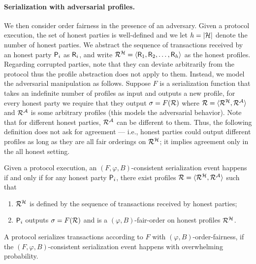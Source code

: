 \paragraph{Serialization with adversarial profiles.}
%
We then consider order fairness in the presence of an adversary.
%
Given a protocol execution, the set of honest parties \honestPartySet is well-defined and we let $h = |\mathcal{H}|$ denote the number of honest parties.
%
We abstract the sequence of transactions received by an honest party $\mathsf{P}_i$ as $\mathsf{R}_i$, and write $\mathcal{R}^\mathcal{H} = \langle \mathsf{R}_1, \mathsf{R}_2, \ldots, \mathsf{R}_h \rangle$ as the honest profiles.
%
Regarding corrupted parties, note that they can deviate arbitrarily from the protocol thus the profile abstraction does not apply to them.
%
Instead, we model the adversarial manipulation as follows.
%
Suppose $F$ is a serialization function that takes an indefinite number of profiles as input and outputs a new profile, for every honest party we require that they output $\sigma = F(\mathcal{R})$ where $\mathcal{R} = \langle \mathcal{R}^\mathcal{H}, \mathcal{R}^\mathcal{A} \rangle$ and $\mathcal{R}^\mathcal{A}$ is some arbitrary profiles (this models the adversarial behavior).
%
Note that for different honest parties, $\mathcal{R}^\mathcal{A}$ can be different to them.
%
Thus, the following definition does not ask for agreement --- i.e., honest parties could output different profiles as long as they are all fair orderings on $\mathcal{R}^\mathcal{H}$; it implies agreement only in the all honest setting.
%
\begin{definition}
    \label{def:fair-order-serialization}

    Given a protocol execution, an $(F, \varphi, B)$-consistent serialization event happens if and only if for any honest party $\mathsf{P}_i$, there exist profiles $\mathcal{R} = \langle \mathcal{R}^\mathcal{H}, \mathcal{R}^\mathcal{A} \rangle$ such that
    \begin{enumerate}[label=(\roman*), nosep]
        \item $\mathcal{R}^\mathcal{H}$ is defined by the sequence of transactions received by honest parties;
        \item $\mathsf{P}_i$ outputs $\sigma = F(\mathcal{R})$ and \orderOutput is a $(\varphi, B)$-fair-order on honest profiles $\mathcal{R}^\mathcal{H}$.
    \end{enumerate}
    A protocol serializes transactions according to $F$ with $(\varphi, B)$-order-fairness, if the $(F, \varphi, B)$-consistent serialization event happens with overwhelming probability.
\end{definition}

